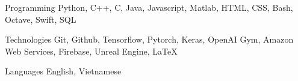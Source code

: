 

\begin{cvskills}

  \cvskill
    {Programming} %
    {Python, C++, C, Java, Javascript, Matlab, HTML, CSS, Bash, Octave, Swift, SQL} %

\cvskill
{Technologies} %
{Git, Github, Tensorflow, Pytorch, Keras, OpenAI Gym, Amazon Web Services, Firebase, Unreal Engine, LaTeX} %

  \cvskill
    {Languages} %
    {English, Vietnamese} %

\end{cvskills}
